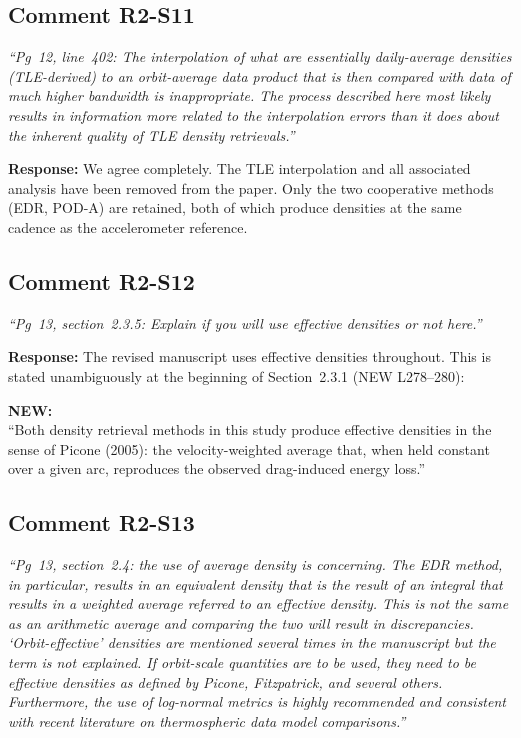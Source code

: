\documentclass[11pt]{article}
\newcommand{\reviewercomment}[1]{%
  \medskip
  \noindent\textit{\color{reviewblue}#1}%
  \medskip
}
\newcommand{\newtext}[1]{%
  \smallskip
  \noindent\hspace{1em}\begin{minipage}{0.92\textwidth}%
  \color{quotegreen}\textbf{NEW:}\\[2pt]``#1''%
  \end{minipage}%
  \smallskip
}
\begin{document}
\subsection{Comment R2-S11}

\reviewercomment{%
``Pg~12, line~402: The interpolation of what are essentially daily-average densities (TLE-derived) to an orbit-average data product that is then compared with data of much higher bandwidth is inappropriate. The process described here most likely results in information more related to the interpolation errors than it does about the inherent quality of TLE density retrievals.''}

\textbf{Response:}
We agree completely. The TLE interpolation and all associated analysis have been removed from the paper. Only the two cooperative methods (EDR, POD-A) are retained, both of which produce densities at the same cadence as the accelerometer reference.


\subsection{Comment R2-S12}

\reviewercomment{``Pg~13, section~2.3.5: Explain if you will use effective densities or not here.''}

\textbf{Response:}
The revised manuscript uses effective densities throughout. This is stated unambiguously at the beginning of Section~2.3.1 (NEW L278--280):

\newtext{Both density retrieval methods in this study produce effective densities in the sense of Picone (2005): the velocity-weighted average that, when held constant over a given arc, reproduces the observed drag-induced energy loss.}


\subsection{Comment R2-S13}

\reviewercomment{%
``Pg~13, section~2.4: the use of average density is concerning. The EDR method, in particular, results in an equivalent density that is the result of an integral that results in a weighted average referred to an effective density. This is not the same as an arithmetic average and comparing the two will result in discrepancies. `Orbit-effective' densities are mentioned several times in the manuscript but the term is not explained. If orbit-scale quantities are to be used, they need to be effective densities as defined by Picone, Fitzpatrick, and several others. Furthermore, the use of log-normal metrics is highly recommended and consistent with recent literature on thermospheric data model comparisons.''}
\end{document}

